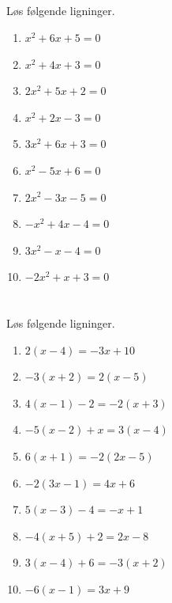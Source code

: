 \documentclass[10pt,a4paper,table]{article}
\begin{document}
\subsection{}
Løs følgende ligninger.

\begin{enumerate}
  \item $x^2 + 6x + 5 = 0$
  \item $x^2 + 4x + 3 = 0$
  \item $2x^2 + 5x + 2 = 0$
  \item $x^2 + 2x - 3 = 0$
  \item $3x^2 + 6x + 3 = 0$
  \item $x^2 - 5x + 6 = 0$
  \item $2x^2 - 3x - 5 = 0$
  \item $-x^2 + 4x - 4 = 0$
  \item $3x^2 - x - 4 = 0$
  \item $-2x^2 + x + 3 = 0$
\end{enumerate}

\section{}
\subsection{}
Løs følgende ligninger.

\begin{enumerate}
  \item $2(x-4)= -3x+10$
  \item $-3(x+2)=2(x-5)$
  \item $4(x-1)-2 = -2(x+3)$
  \item $-5(x-2)+x = 3(x-4)$
  \item $6(x+1)= -2(2x-5)$
  \item $-2(3x-1)=4x+6$
  \item $5(x-3)-4 = -x+1$
  \item $-4(x+5)+2 = 2x-8$
  \item $3(x-4)+6 = -3(x+2)$
  \item $-6(x-1)=3x+9$
\end{enumerate}
\subsection{}
\end{document}
